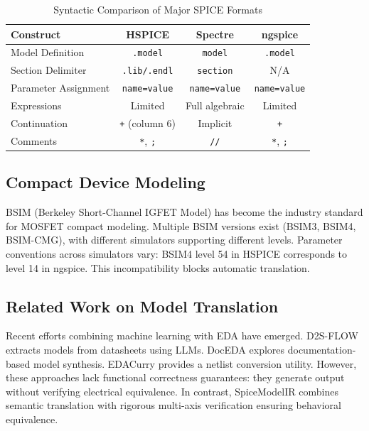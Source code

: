 \documentclass[conference]{IEEEtran}
\begin{document}
\begin{table}[!t]
\caption{Syntactic Comparison of Major SPICE Formats}
\label{tab:simulators}
\centering
\renewcommand{\arraystretch}{1.15}
\begin{tabular}{@{}lccc@{}}
\toprule
\textbf{Construct} & \textbf{HSPICE} & \textbf{Spectre} & \textbf{ngspice} \\
\midrule
Model Definition & \texttt{.model} & \texttt{model} & \texttt{.model} \\
Section Delimiter & \texttt{.lib/.endl} & \texttt{section} & N/A \\
Parameter Assignment & \texttt{name=value} & \texttt{name=value} & \texttt{name=value} \\
Expressions & Limited & Full algebraic & Limited \\
Continuation & \texttt{+} (column 6) & Implicit & \texttt{+} \\
Comments & \texttt{*}, \texttt{;} & \texttt{//} & \texttt{*}, \texttt{;} \\
\bottomrule
\end{tabular}
\end{table}

\subsection{Compact Device Modeling}

BSIM (Berkeley Short-Channel IGFET Model) has become the industry standard for MOSFET compact modeling. Multiple BSIM versions exist (BSIM3, BSIM4, BSIM-CMG), with different simulators supporting different levels. Parameter conventions across simulators vary: BSIM4 level 54 in HSPICE corresponds to level 14 in ngspice. This incompatibility blocks automatic translation.

\subsection{Related Work on Model Translation}

Recent efforts combining machine learning with EDA have emerged. D2S-FLOW~\cite{d2s} extracts models from datasheets using LLMs. DocEDA explores documentation-based model synthesis. EDACurry provides a netlist conversion utility. However, these approaches lack functional correctness guarantees: they generate output without verifying electrical equivalence. In contrast, SpiceModelIR combines semantic translation with rigorous multi-axis verification ensuring behavioral equivalence.
\end{document}
